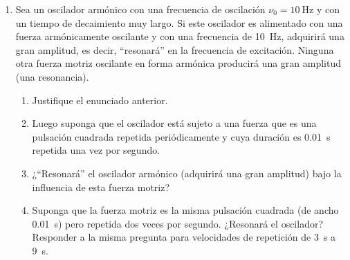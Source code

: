 \documentclass[11pt,spanish,a4paper]{article}
\begin{document}
\begin{enumerate}
\item Sea un oscilador armónico con una frecuencia de oscilación \(\nu_0= \SI{10}{\hertz}\) y con un tiempo de decaimiento muy largo.
Si este oscilador es alimentado con una fuerza armónicamente oscilante y con una frecuencia de \SI{10}{\hertz}, adquirirá una gran amplitud, es decir, ``resonará'' en la frecuencia de excitación.
Ninguna otra fuerza motriz oscilante en forma armónica producirá una gran amplitud (una resonancia). 
\begin{enumerate}
	\item Justifique el enunciado anterior. 
	\item Luego suponga que el oscilador está sujeto a una fuerza que es una pulsación cuadrada repetida periódicamente y cuya duración es \SI{0.01}{\second} repetida una vez por segundo.
	\item ¿``Resonará'' el oscilador armónico (adquirirá una gran amplitud) bajo la influencia de esta fuerza motriz?
	\item Suponga que la fuerza motriz es la misma pulsación cuadrada (de ancho \SI{0.01}{\second}) pero repetida dos veces por segundo.
	¿Resonará el oscilador?
	Responder a la misma pregunta para velocidades de repetición de \SI{3}{\second} a \SI{9}{\second}.
\end{enumerate}


\end{enumerate}
\end{document}
